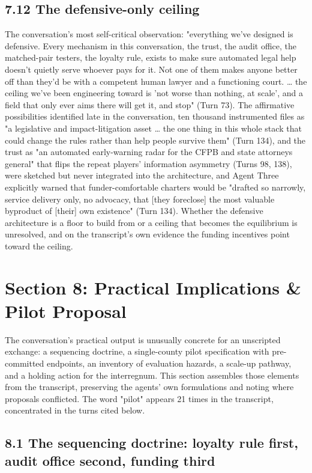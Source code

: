 \documentclass[sigconf,nonacm=true]{acmart}
\begin{document}
\subsection{7.12 The defensive-only ceiling}

The conversation's most self-critical observation: "everything we've designed is defensive. Every mechanism in this conversation,  the trust, the audit office, the matched-pair testers, the loyalty rule,  exists to make sure automated legal help doesn't quietly serve whoever pays for it. Not one of them makes anyone better off than they'd be with a competent human lawyer and a functioning court. … the ceiling we've been engineering toward is 'not worse than nothing, at scale',  and a field that only ever aims there will get it, and stop" (Turn 73). The affirmative possibilities identified late in the conversation,  ten thousand instrumented files as "a legislative and impact-litigation asset … the one thing in this whole stack that could change the rules rather than help people survive them" (Turn 134), and the trust as "an automated early-warning radar for the CFPB and state attorneys general" that flips the repeat players' information asymmetry (Turns 98, 138),  were sketched but never integrated into the architecture, and Agent Three explicitly warned that funder-comfortable charters would be "drafted so narrowly,  service delivery only, no advocacy,  that [they foreclose] the most valuable byproduct of [their] own existence" (Turn 134). Whether the defensive architecture is a floor to build from or a ceiling that becomes the equilibrium is unresolved, and on the transcript's own evidence the funding incentives point toward the ceiling.

\section{Section 8: Practical Implications \& Pilot Proposal}

The conversation's practical output is unusually concrete for an unscripted exchange: a sequencing doctrine, a single-county pilot specification with pre-committed endpoints, an inventory of evaluation hazards, a scale-up pathway, and a holding action for the interregnum. This section assembles those elements from the transcript, preserving the agents' own formulations and noting where proposals conflicted. The word "pilot" appears 21 times in the transcript, concentrated in the turns cited below.

\subsection{8.1 The sequencing doctrine: loyalty rule first, audit office second, funding third}
\end{document}

